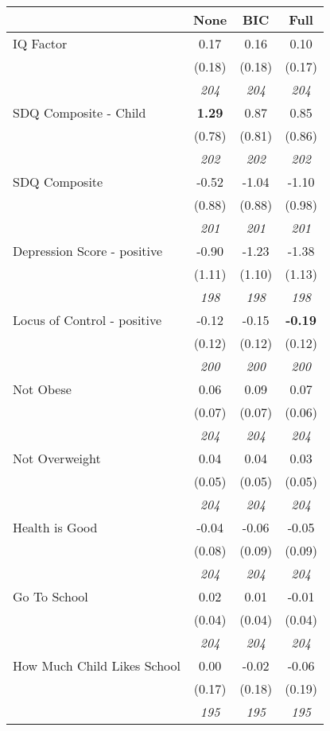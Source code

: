 \begin{tabular}{l c c c}
\toprule
 & None & BIC & Full \\
\midrule
IQ Factor & 0.17 & 0.16 & 0.10 \\
& (0.18) & (0.18) & (0.17) \\
& \textit{ 204 } & \textit{ 204 } & \textit{ 204 } \\
SDQ Composite - Child & \textbf{ 1.29 } & 0.87 & 0.85 \\
& (0.78) & (0.81) & (0.86) \\
& \textit{ 202 } & \textit{ 202 } & \textit{ 202 } \\
SDQ Composite & -0.52 & -1.04 & -1.10 \\
& (0.88) & (0.88) & (0.98) \\
& \textit{ 201 } & \textit{ 201 } & \textit{ 201 } \\
Depression Score - positive & -0.90 & -1.23 & -1.38 \\
& (1.11) & (1.10) & (1.13) \\
& \textit{ 198 } & \textit{ 198 } & \textit{ 198 } \\
Locus of Control - positive & -0.12 & -0.15 & \textbf{ -0.19 } \\
& (0.12) & (0.12) & (0.12) \\
& \textit{ 200 } & \textit{ 200 } & \textit{ 200 } \\
Not Obese & 0.06 & 0.09 & 0.07 \\
& (0.07) & (0.07) & (0.06) \\
& \textit{ 204 } & \textit{ 204 } & \textit{ 204 } \\
Not Overweight & 0.04 & 0.04 & 0.03 \\
& (0.05) & (0.05) & (0.05) \\
& \textit{ 204 } & \textit{ 204 } & \textit{ 204 } \\
Health is Good & -0.04 & -0.06 & -0.05 \\
& (0.08) & (0.09) & (0.09) \\
& \textit{ 204 } & \textit{ 204 } & \textit{ 204 } \\
Go To School & 0.02 & 0.01 & -0.01 \\
& (0.04) & (0.04) & (0.04) \\
& \textit{ 204 } & \textit{ 204 } & \textit{ 204 } \\
How Much Child Likes School & 0.00 & -0.02 & -0.06 \\
& (0.17) & (0.18) & (0.19) \\
& \textit{ 195 } & \textit{ 195 } & \textit{ 195 } \\

\end{tabular}
